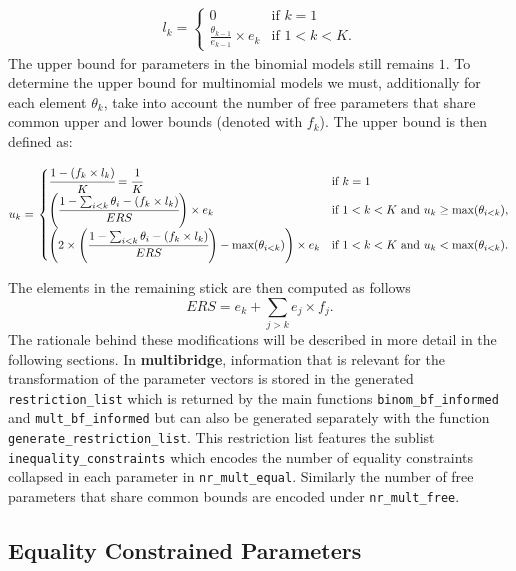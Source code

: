 \begin{appendix}
\begin{align}
\label{Eq:lowerBoundAdjusted}
  l_k = \left.
  \begin{cases}
      0 & \text{if } k = 1 \\
      \frac{\theta_{k - 1}}{e_{k-1}} \times e_k & \text{if } 1 < k < K.
  \end{cases}
    \right.
\end{align} The upper bound for parameters in the binomial models still
remains \(1\). To determine the upper bound for multinomial models we
must, additionally for each element \(\theta_k\), take into account the
number of free parameters that share common upper and lower bounds
(denoted with \(f_k\)). The upper bound is then defined as:

\begin{align}
  u_k = \left.
  \begin{cases}
      \cfrac{1 - (f_k \times l_k)}{K} = \cfrac{1}{K} & \text{if } k = 1 \\
     \left( \cfrac{1 - \sum_{i < k} \theta_i - (f_k \times l_k)}{ERS} \right) \times e_k & \text{if } 1 < k < K \text{ and } u_k \geq \text{max}(\theta_{i < k}), \\
    \left( 2 \times \left( \cfrac{1 - \sum_{i < k} \theta_i - (f_k \times l_k)}{ERS} \right) - \text{max}(\theta_{i < k}) \right)  \times e_k & \text{if } 1 < k < K \text{ and } u_k < \text{max}(\theta_{i < k}).
  \end{cases}
    \right.
\end{align}

The elements in the remaining stick are then computed as follows
\[ERS = e_k + \sum_{j > k} e_j \times f_j.\] The rationale behind these
modifications will be described in more detail in the following
sections. In \textbf{multibridge}, information that is relevant for the
transformation of the parameter vectors is stored in the generated
\texttt{restriction\_list} which is returned by the main functions
\texttt{binom\_bf\_informed} and \texttt{mult\_bf\_informed} but can
also be generated separately with the function
\texttt{generate\_restriction\_list}. This restriction list features the
sublist \texttt{inequality\_constraints} which encodes the number of
equality constraints collapsed in each parameter in
\texttt{nr\_mult\_equal}. Similarly the number of free parameters that
share common bounds are encoded under \texttt{nr\_mult\_free}.

\hypertarget{equality-constrained-parameters}{%
\subsection{Equality Constrained
Parameters}\label{equality-constrained-parameters}}


\end{appendix}
